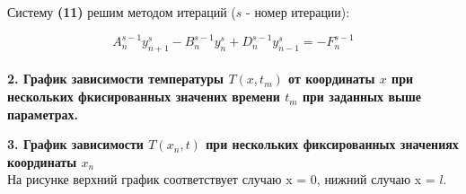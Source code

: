 \documentclass[a4paper,oneside,12pt]{extreport}
\begin{document}
Систему \textbf{(11)} решим методом итераций ($s$ - номер итерации): 

\begin{equation}
	A^{s - 1}_{n} y^s_{n + 1} - B^{s - 1}_{n} y^{s}_{n} + D^{s - 1}_{n} y^{s}_{n - 1} = -F^{s - 1}_{n}
\end{equation}\\

\textbf{2. График зависимости температуры $T(x, t_{m})$ от координаты $x$ при нескольких фкисированных значених времени $t_{m}$ при заданных выше параметрах. }\\

\begin{figure}[ht!]
\end{figure}

\textbf{3. График зависимости $T(x_{n}, t)$ при нескольких фиксированных значениях координаты $x_{n}$}\\

На рисунке верхний график соответствует случаю x = 0, нижний случаю x = $l$.

\begin{figure}[ht!]
\end{figure}
\end{document}
